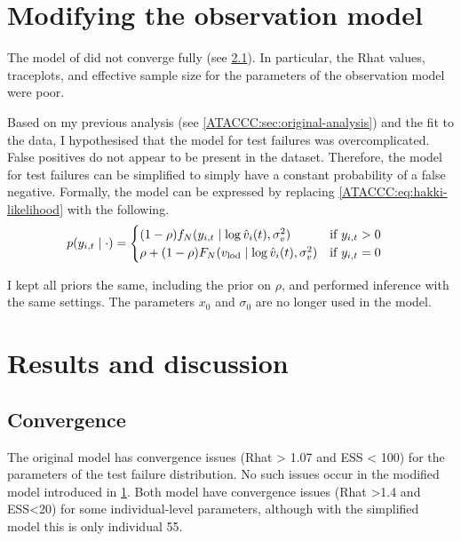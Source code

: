\documentclass[thesis.tex]{subfiles}
\begin{document}
\section{Modifying the observation model} \label{ATACCC:sec:observation-modification}

The model of \textcite{hakkiOnset} did not converge fully (see \cref{ATACCC:sec:convergence}).
In particular, the Rhat values, traceplots, and effective sample size for the parameters of the observation model were poor.

Based on my previous analysis (see \cref{ATACCC:sec:original-analysis}) and the fit to the data, I hypothesised that the model for test failures was overcomplicated.
False positives do not appear to be present in the dataset.
Therefore, the model for test failures can be simplified to simply have a constant probability of a false negative.
Formally, the model can be expressed by replacing \cref{ATACCC:eq:hakki-likelihood} with the following.
\begin{align}
p(y_{i,t} \mid \cdot) &= \begin{cases}
    (1 - \rho) f_N(y_{i,t} \mid \log \hat{v}_i(t), \sigma_v^2) & \text{if $y_{i,t} > 0$}\\
    \rho + (1 - \rho) F_N(v_\text{lod} \mid \log \hat{v}_i(t), \sigma_v^2) & \text{if $y_{i,t} = 0$}
\end{cases}
\end{align}

I kept all priors the same, including the prior on $\rho$, and performed inference with the same settings.
The parameters $x_0$ and $\sigma_0$ are no longer used in the model.

\section{Results and discussion} \label{ATACCC:sec:results-discussion}

\subsection{Convergence} \label{ATACCC:sec:convergence}

The original \textcite{hakkiOnset} model has convergence issues (Rhat > 1.07 and ESS < 100) for the parameters of the test failure distribution.
No such issues occur in the modified model introduced in \cref{ATACCC:sec:observation-modification}.
Both model have convergence issues (Rhat >1.4 and ESS<20) for some individual-level parameters, although with the simplified model this is only individual 55.
\end{document}
